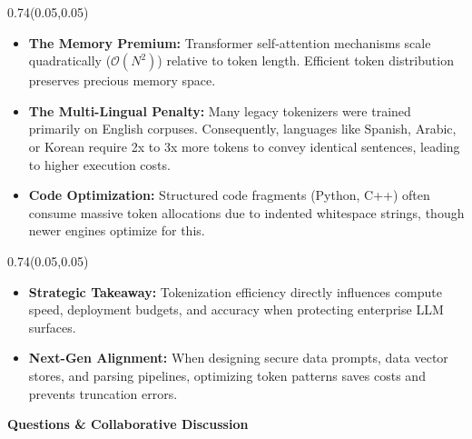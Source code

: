 \documentclass[aspectratio=169]{beamer}
\begin{document}
	\begin{frame}{}
		\setlength{\TPHorizModule}{\textwidth}
		\setlength{\TPVertModule}{\textwidth}
		\begin{textblock}{0.74}(0.05,0.05)
			\bfseries\large{}
		\end{textblock}
		
		\vspace{2em}
		\begin{itemize}
			\item \textbf{The Memory Premium:} Transformer self-attention mechanisms scale quadratically ($\mathcal{O}(N^2)$) relative to token length. Efficient token distribution preserves precious memory space.
			\item \textbf{The Multi-Lingual Penalty:} Many legacy tokenizers were trained primarily on English corpuses. Consequently, languages like Spanish, Arabic, or Korean require 2x to 3x more tokens to convey identical sentences, leading to higher execution costs.
			\item \textbf{Code Optimization:} Structured code fragments (Python, C++) often consume massive token allocations due to indented whitespace strings, though newer engines optimize for this.
		\end{itemize}
	\end{frame}
	
	\begin{frame}{}
		\setlength{\TPHorizModule}{\textwidth}
		\setlength{\TPVertModule}{\textwidth}
		\begin{textblock}{0.74}(0.05,0.05)
			\bfseries\large{}
		\end{textblock}
		
		\vspace{2em}
		\begin{itemize}
			\item \textbf{Strategic Takeaway:} Tokenization efficiency directly influences compute speed, deployment budgets, and accuracy when protecting enterprise LLM surfaces.
			\item \textbf{Next-Gen Alignment:} When designing secure data prompts, data vector stores, and parsing pipelines, optimizing token patterns saves costs and prevents truncation errors.
		\end{itemize}
		
		\vspace{1.5em}
		\begin{center}
			\large\bfseries Questions \& Collaborative Discussion
		\end{center}
	\end{frame}
	
	
\end{document}
